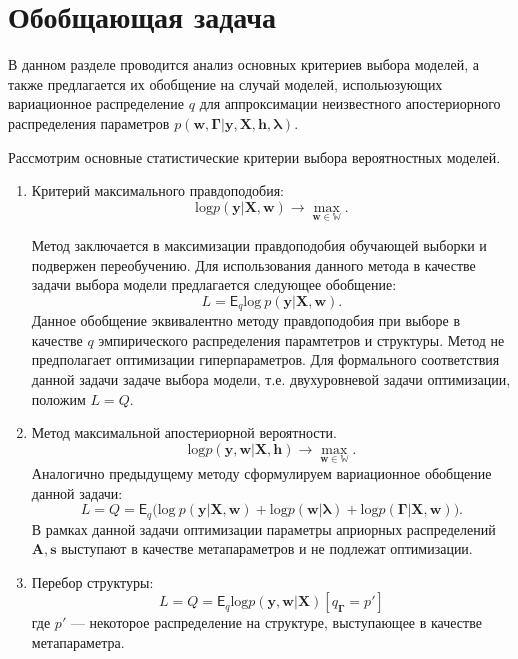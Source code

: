 \section{Обобщающая задача}
В данном разделе проводится анализ основных критериев выбора моделей, а также предлагается их обобщение на случай моделей, испольюзующих вариационное распределение $q$ для аппроксимации неизвестного апостериорного распределения параметров $p(\mathbf{w}, \boldsymbol{\Gamma}|\mathbf{y}, \mathbf{X}, \mathbf{h}, \boldsymbol{\lambda})$.

Рассмотрим основные статистические критерии выбора вероятностных моделей. 
\begin{enumerate}
\item Критерий максимального правдоподобия:
\[
    \text{log}p(\mathbf{y}|\mathbf{X}, \mathbf{w}) \to \max_{\mathbf{w} \in \mathbb{W}}.
\]

Метод заключается в максимизации правдоподобия обучающей выборки и подвержен переобучению.
Для использования данного метода в качестве задачи выбора модели предлагается следующее обобщение:
\begin{equation}
\label{eq:optim_ml}
    L =  \mathsf{E}_q \text{log}~p(\mathbf{y}|\mathbf{X}, \mathbf{w}).
\end{equation}
Данное обобщение эквивалентно  методу правдоподобия при выборе в качестве $q$ эмпирического распределения парамтетров и структуры.
Метод не предполагает оптимизации гиперпараметров. Для формального соответствия данной задачи задаче выбора модели, т.е. двухуровневой задачи оптимизации, положим $L=Q$.


\item Метод максимальной апостериорной вероятности. 
\[
    \text{log}p(\mathbf{y},\mathbf{w}|\mathbf{X}, \mathbf{h} ) \to \max_{\mathbf{w} \in \mathbb{W}}.
\]
Аналогично предыдущему методу сформулируем вариационное обобщение данной задачи:
\begin{equation}
\label{eq:optim_map}
    L = Q = \mathsf{E}_q \bigl(\text{log}~p(\mathbf{y}|\mathbf{X}, \mathbf{w})+\text{log}p(\mathbf{w}|\boldsymbol{\lambda}) + \text{log}p(\boldsymbol{\Gamma}|\mathbf{X}, \mathbf{w})\bigr).
\end{equation}
В рамках данной задачи оптимизации параметры априорных распределений $\mathbf{A}, \mathbf{s}$ выступают в качестве метапараметров и не подлежат оптимизации.



\item Перебор структуры:
\begin{equation}
\label{eq:optim_struct}
    L =  Q = \mathsf{E}_q\text{log}p(\mathbf{y}, \mathbf{w}|\mathbf{X})[q_{\boldsymbol{\Gamma}} = p']
\end{equation}
где $p'$ --- некоторое распределение на структуре, выступающее в качестве метапараметра.





\end{enumerate}
